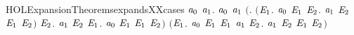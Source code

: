 \newcommand{\HOLExpansionTheoremsexpandsXXANDXXTRACEXXtau}{\UseVerbatim{HOLExpansionTheoremsexpandsXXANDXXTRACEXXtau}}
\begin{SaveVerbatim}{HOLExpansionTheoremsexpandsXXcases}
\HOLTokenTurnstile{} \HOLSymConst{\HOLTokenForall{}}\ensuremath{\HOLBoundVar{a}\sb{\mathrm{0}}} \ensuremath{\HOLBoundVar{a}\sb{\mathrm{1}}}.
       \ensuremath{\HOLBoundVar{a}\sb{\mathrm{0}}}  \ensuremath{\HOLBoundVar{a}\sb{\mathrm{1}}} \HOLSymConst{\HOLTokenEquiv{}}
       \ensuremath{(}\HOLSymConst{\HOLTokenForall{}}.
            \ensuremath{(}\HOLSymConst{\HOLTokenForall{}}\ensuremath{\HOLBoundVar{E}\sb{\mathrm{1}}}.
                 \ensuremath{\HOLBoundVar{a}\sb{\mathrm{0}}} \HOLTokenTransBegin{} \HOLTokenTransEnd \ensuremath{\HOLBoundVar{E}\sb{\mathrm{1}}} \HOLSymConst{\HOLTokenImp{}}
                 \HOLSymConst{\HOLTokenExists{}}\ensuremath{\HOLBoundVar{E}\sb{\mathrm{2}}}. \ensuremath{\HOLBoundVar{a}\sb{\mathrm{1}}} \HOLTokenTransBegin{} \HOLTokenTransEnd \ensuremath{\HOLBoundVar{E}\sb{\mathrm{2}}} \HOLSymConst{\HOLTokenConj{}} \ensuremath{\HOLBoundVar{E}\sb{\mathrm{1}}}  \ensuremath{\HOLBoundVar{E}\sb{\mathrm{2}}}\ensuremath{)} \HOLSymConst{\HOLTokenConj{}}
            \HOLSymConst{\HOLTokenForall{}}\ensuremath{\HOLBoundVar{E}\sb{\mathrm{2}}}.
                \ensuremath{\HOLBoundVar{a}\sb{\mathrm{1}}} \HOLTokenTransBegin{} \HOLTokenTransEnd \ensuremath{\HOLBoundVar{E}\sb{\mathrm{2}}} \HOLSymConst{\HOLTokenImp{}}
                \HOLSymConst{\HOLTokenExists{}}\ensuremath{\HOLBoundVar{E}\sb{\mathrm{1}}}. \ensuremath{\HOLBoundVar{a}\sb{\mathrm{0}}} \HOLTokenWeakTransBegin{} \HOLTokenWeakTransEnd \ensuremath{\HOLBoundVar{E}\sb{\mathrm{1}}} \HOLSymConst{\HOLTokenConj{}} \ensuremath{\HOLBoundVar{E}\sb{\mathrm{1}}}  \ensuremath{\HOLBoundVar{E}\sb{\mathrm{2}}}\ensuremath{)} \HOLSymConst{\HOLTokenConj{}}
       \ensuremath{(}\HOLSymConst{\HOLTokenForall{}}\ensuremath{\HOLBoundVar{E}\sb{\mathrm{1}}}.
            \ensuremath{\HOLBoundVar{a}\sb{\mathrm{0}}} \HOLTokenTransBegin\HOLConst{\ensuremath{\tau}}\HOLTokenTransEnd \ensuremath{\HOLBoundVar{E}\sb{\mathrm{1}}} \HOLSymConst{\HOLTokenImp{}}
            \ensuremath{\HOLBoundVar{E}\sb{\mathrm{1}}}  \ensuremath{\HOLBoundVar{a}\sb{\mathrm{1}}} \HOLSymConst{\HOLTokenDisj{}} \HOLSymConst{\HOLTokenExists{}}\ensuremath{\HOLBoundVar{E}\sb{\mathrm{2}}}. \ensuremath{\HOLBoundVar{a}\sb{\mathrm{1}}} \HOLTokenTransBegin\HOLConst{\ensuremath{\tau}}\HOLTokenTransEnd \ensuremath{\HOLBoundVar{E}\sb{\mathrm{2}}} \HOLSymConst{\HOLTokenConj{}} \ensuremath{\HOLBoundVar{E}\sb{\mathrm{1}}}  \ensuremath{\HOLBoundVar{E}\sb{\mathrm{2}}}\ensuremath{)} \HOLSymConst{\HOLTokenConj{}}

\end{SaveVerbatim}
